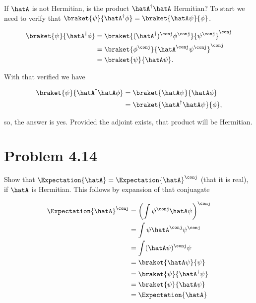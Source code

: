 If $\hatA$ is not Hermitian, is the product $\hatA^\dagger \hatA$ Hermitian?  To start we need to verify that $\braket{\psi}{\hatA^\dagger \phi} = \braket{\hatA \psi}{\phi}$.

\begin{align*}
\braket{ \psi }{ \hatA^\dagger \phi } 
&=
{\braket{ (\hatA^\dagger)^\conj \phi^\conj }{ \psi^\conj }}^\conj \\
&=
{\braket{ \phi^\conj }{ \hatA^\conj \psi^\conj }}^\conj \\
&=
\braket{ \psi }{ \hatA \psi }.
\end{align*}

With that verified we have

\begin{align*}
\braket{ \psi }{ \hatA^\dagger \hatA \phi } 
&=
\braket{ \hatA \psi }{ \hatA \phi }  \\
&=
\braket{ \hatA^\dagger \hatA \psi }{ \phi },
\end{align*}

so, the answer is yes.  Provided the adjoint exists, that product will be Hermitian.

\section{Problem 4.14}

Show that $\Expectation{\hatA} = \Expectation{\hatA}^\conj$ (that it is real), if $\hatA$ is Hermitian.  This follows by expansion of that conjuagate

\begin{align*}
\Expectation{\hatA}^\conj 
&= \left(\int \psi^\conj \hatA \psi \right)^\conj \\
&= \int \psi \hatA^\conj \psi^\conj \\
&= \int (\hatA \psi)^\conj \psi \\
&= \braket{ \hatA \psi }{ \psi } \\
&= \braket{ \psi }{ \hatA^\dagger \psi } \\
&= \braket{ \psi }{ \hatA \psi } \\
&= \Expectation{\hatA}
\end{align*}

\EndArticle
